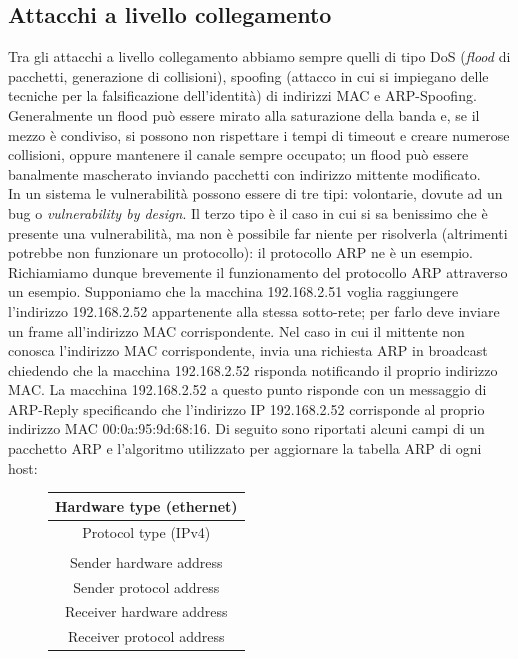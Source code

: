 \subsection{Attacchi a livello collegamento}
Tra gli attacchi a livello collegamento abbiamo sempre quelli di tipo DoS (\textit{flood} di pacchetti, generazione di collisioni), spoofing (attacco in cui si impiegano delle tecniche per la falsificazione dell'identità) di indirizzi MAC e ARP-Spoofing. Generalmente un flood può essere mirato alla saturazione della banda e, se il mezzo è condiviso, si possono non rispettare i tempi di timeout e creare numerose collisioni, oppure mantenere il canale sempre occupato; un flood può essere banalmente mascherato inviando pacchetti con indirizzo mittente modificato.\\
In un sistema le vulnerabilità possono essere di tre tipi: volontarie, dovute ad un bug o \textit{vulnerability by design}. Il terzo tipo è il caso in cui si sa benissimo che è presente una vulnerabilità, ma non è possibile far niente per risolverla (altrimenti potrebbe non funzionare un protocollo): il protocollo ARP ne è un esempio.\\
Richiamiamo dunque brevemente il funzionamento del protocollo ARP attraverso un esempio. Supponiamo che la macchina 192.168.2.51 voglia raggiungere l'indirizzo 192.168.2.52 appartenente alla stessa sotto-rete; per farlo deve inviare un frame all'indirizzo MAC corrispondente. Nel caso in cui il mittente non conosca l'indirizzo MAC corrispondente, invia una richiesta ARP in broadcast chiedendo che la macchina 192.168.2.52 risponda notificando il proprio indirizzo MAC. La macchina 192.168.2.52 a questo punto risponde con un messaggio di ARP-Reply specificando che l'indirizzo IP 192.168.2.52 corrisponde al proprio indirizzo MAC 00:0a:95:9d:68:16. Di seguito sono riportati alcuni campi di un pacchetto ARP e l'algoritmo utilizzato per aggiornare la tabella ARP di ogni host:
\begin{figure}[htbp]
	\centering
	\begin{tabular}{|c|}
		\hline
		Hardware type (ethernet) \\
		\hline
		Protocol type (IPv4) \\
		\hline
		[$\dots$] \\
		\hline
		Sender hardware address \\
		\hline
		Sender protocol address \\
		\hline
		Receiver hardware address \\
		\hline
		Receiver protocol address \\ \hline
	\end{tabular}
\end{figure}\\
